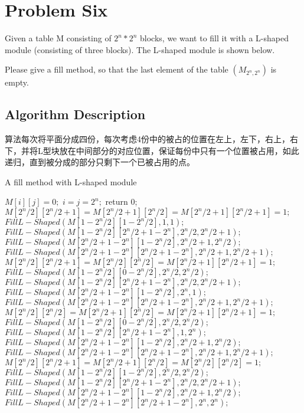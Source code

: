 \documentclass{article}
\begin{document}
\newpage
\section{Problem Six}
Given a table M consisting of $2^n * 2^n$ blocks, we want to fill it with a L-shaped module (consisting of three blocks). The L-shaped module is shown below.

Please give a fill method, so that the last element of the table $(M_{2^n,2^n})$ is empty.

\subsection{Algorithm Description}
算法每次将平面分成四份，每次考虑4份中的被占的位置在左上，左下，右上，右下，并将L型块放在中间部分的对应位置，保证每份中只有一个位置被占用，如此递归，直到被分成的部分只剩下一个已被占用的点。

\begin{algorithm}[htbp]  
  \caption{A fill method with L-shaped module}  
  \begin{algorithmic}[1] 
	\State $M[i][j] = 0;$
	\EndFor
	\EndFor
	\State $i = j = 2^n;$
	\State return 0;
	\EndIf
	\State $M[2^n/2][2^n/2+1]= M[2^n/2+1][2^n/2]= M[2^n/2+1][2^n/2+1] =1;$
	\State $FillL-Shaped(M[1-2^n/2][1-2^n/2], 1, 1);$
	\State $FillL-Shaped(M[1-2^n/2][2^n/2+1-2^n], 2^n/2, 2^n/2+1);$
	\State $FillL-Shaped(M[2^n/2+1-2^n][1-2^n/2], 2^n/2+1, 2^n/2);$
	\State $FillL-Shaped(M[2^n/2+1-2^n][2^n/2+1-2^n], 2^n/2+1, 2^n/2+1);$
	\EndIf
	\State $M[2^n/2][2^n/2+1]= M[2^n/2][2^n/2]= M[2^n/2+1][2^n/2+1] =1;$
	\State $FillL-Shaped(M[1-2^n/2][0-2^n/2], 2^n/2, 2^n/2);$
	\State $FillL-Shaped(M[1-2^n/2][2^n/2+1-2^n], 2^n/2, 2^n/2+1);$
	\State $FillL-Shaped(M[2^n/2+1-2^n][1-2^n/2], 2^n, 1);$
	\State $FillL-Shaped(M[2^n/2+1-2^n][2^n/2+1-2^n], 2^n/2+1, 2^n/2+1);$
	\EndIf
	\State $M[2^n/2][2^n/2]= M[2^n/2+1][2^n/2]= M[2^n/2+1][2^n/2+1] =1;$
	\State $FillL-Shaped(M[1-2^n/2][0-2^n/2], 2^n/2, 2^n/2);$
	\State $FillL-Shaped(M[1-2^n/2][2^n/2+1-2^n], 1, 2^n);$
	\State $FillL-Shaped(M[2^n/2+1-2^n][1-2^n/2], 2^n/2+1, 2^n/2);$
	\State $FillL-Shaped(M[2^n/2+1-2^n][2^n/2+1-2^n], 2^n/2+1, 2^n/2+1);$
	\EndIf
	\State $M[2^n/2][2^n/2+1]= M[2^n/2+1][2^n/2]= M[2^n/2][2^n/2] =1;$
	\State $FillL-Shaped(M[1-2^n/2][1-2^n/2], 2^n/2, 2^n/2);$
	\State $FillL-Shaped(M[1-2^n/2][2^n/2+1-2^n], 2^n/2, 2^n/2+1);$
	\State $FillL-Shaped(M[2^n/2+1-2^n][1-2^n/2], 2^n/2+1, 2^n/2);$
	\State $FillL-Shaped(M[2^n/2+1-2^n][2^n/2+1-2^n], 2^n, 2^n);$
	\EndIf
    \EndFunction  
  \end{algorithmic}  
\end{algorithm} 
\end{document}
